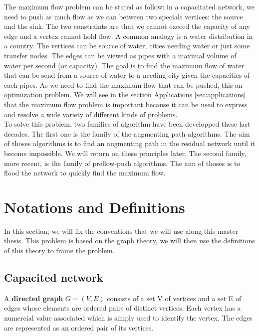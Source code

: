The maximum flow problem can be stated as follow: in a capacitated network, we need to push as much flow as we can between two specials vertices: the source and the sink. The two constraints are that we cannot exceed the capacity of any edge and a vertex cannot hold flow. A common analogy is a water distribution in a country. The vertices can be source of water, cities needing water or just some transfer nodes. The edges can be viewed as pipes with a maximal volume of water per second (or capacity). The goal is to find the maximum flow of water that can be send from a source of water to a needing city given the capacities of each pipes. As we need to find the maximum flow that can be pushed, this an optimization problem. We will see in the section Applications \ref{sec:applications} that the maximum flow problem is important because it can be used to express and resolve a wide variety of different kinds of problems.\\

To solve this problem, two families of algorithm have been developped these last decades. The first one is the family of the augmenting path algorithms. The aim of thoses algorithms is to find an augmenting path in the residual network until it become impossible. We will return on these principles later. The second family, more recent, is the family of preflow-push algorithms. The aim of thoses is to flood the network to quickly find the maximum flow. \\

\section{Notations and Definitions}

In this section, we will fix the conventions that we will use along this master thesis. This problem is based on the graph theory, we will then use the definitions of this theory to frame the problem.

\subsection{Capacited network}
\begin{definition}
\label{dgraph}
A \textbf{directed graph} $G = (V, E)$ consists of a set V of vertices and a set E of edges whose elements are ordered pairs of distinct vertices. Each vertex has a numercial value associated which is simply used to identify the vertex. The edges are represented as an ordered pair of its vertices.
\end{definition}


